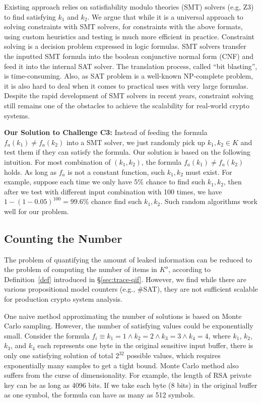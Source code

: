 Existing approach relies on satisfiability modulo theories (SMT) solvers (e.g, Z3) to 
find satisfying $k_1$ and $k_2$.
We argue that while it is a universal approach to solving constraints with SMT 
solvers, for constraints with the above formats, using custom heuristics and testing
 is much more
efficient in practice. Constraint solving is a decision problem expressed in 
logic formulas. SMT solvers transfer the inputted SMT formula into 
the boolean conjunctive normal form (CNF) and feed it into the internal 
SAT solver. The translation process, called ``bit blasting'', is time-consuming.
Also, as SAT problem is a well-known NP-complete problem, it is also hard to 
deal when it comes to practical uses with very large formulas. 
Despite the rapid development of SMT solvers in recent years, constraint solving still
remains one of the obstacles to achieve the scalability for real-world crypto systems.

\vspace*{2pt}
\textbf{Our Solution to Challenge C3:}
Instead of feeding the formula $f_a(k_1) \neq f_a(k_2)$ into a SMT solver, we just
randomly pick up $k_1, k_2 \in K$ and test them if they can satisfy the formula. Our
solution is based on the following intuition. For most combination of 
$(k_{1}, k_{2} )$, the formula $f_a(k_1) \neq f_a(k_2)$ holds. As long as 
$f_a$ is not a constant function, such $k_1, k_2$ must exist. For example,
suppose each time we only have 5\% chance to find such $k_1, k_2$, then
after we test with different input combination with 100 times, we have 
$1 - (1-0.05)^{100} = 99.6\%$ chance find such $k_1, k_2$. Such random algorithms
work well for our problem. 

\subsection{Counting the Number}
\label{MCreasons}
The problem of quantifying the amount of leaked information can be reduced to 
the problem of computing the number of items in $K^o$, according to Definition~\ref{def}
introduced in \S\ref{sec:trace-qif}.
However, we find while there are various propositional model counters (e.g., \#SAT),
they are not sufficient scalable for production crypto system analysis. 

One naive method approximating the number of solutions is based on Monte Carlo sampling.
However, the number of satisfying values could be exponentially small. Consider the formula
$f_i\equiv{k_1} = 1\land{k_2} = 2\land{k_3} = 3\land{k_4} = 4$, where $k_1$, $k_2$, $k_3$, and $k_4$ each represents one byte in the original sensitive input buffer, 
there is only one satisfying solution of total $2^{32}$ possible
values, which requires exponentially many samples to get a tight bound. 
Monte Carlo method also suffers from the curse of dimensionality. For example, 
the length of RSA private key can be as long as 4096 bits.
If we take each byte (8 bits) in the original buffer as one symbol, the formula can have 
as many as 512 symbols. 

